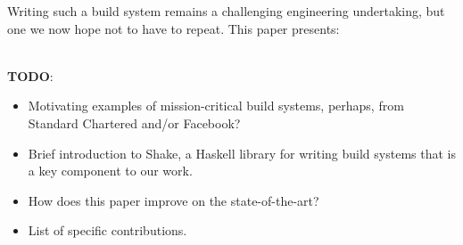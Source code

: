 Writing such a build system remains a challenging engineering undertaking, but one we now hope not to have to repeat.
This paper presents:




~\\
\textbf{TODO}:
\begin{itemize}
  \item Motivating examples of mission-critical build systems, perhaps, from
  Standard Chartered and/or Facebook?
  \item Brief introduction to Shake, a Haskell library for writing build systems
  that is a key component to our work.
  \item How does this paper improve on the state-of-the-art?
  \item List of specific contributions.
\end{itemize}
